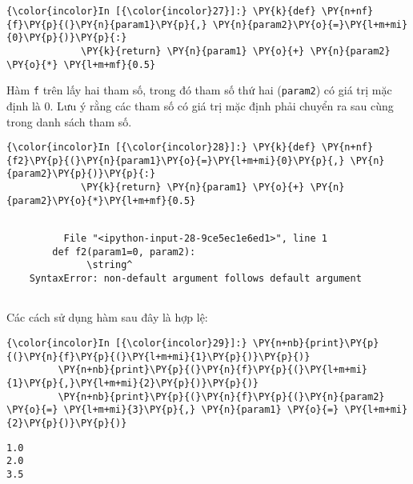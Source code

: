     
\begin{Verbatim}[commandchars=\\\{\}]
{\color{incolor}In [{\color{incolor}27}]:} \PY{k}{def} \PY{n+nf}{f}\PY{p}{(}\PY{n}{param1}\PY{p}{,} \PY{n}{param2}\PY{o}{=}\PY{l+m+mi}{0}\PY{p}{)}\PY{p}{:}
             \PY{k}{return} \PY{n}{param1} \PY{o}{+} \PY{n}{param2} \PY{o}{*} \PY{l+m+mf}{0.5}
\end{Verbatim}
    

    Hàm \texttt{f} trên lấy hai tham số, trong đó tham số thứ hai
(\texttt{param2}) có giá trị mặc định là 0. Lưu ý rằng các tham số có
giá trị mặc định phải chuyển ra sau cùng trong danh sách tham số.

    
\begin{Verbatim}[commandchars=\\\{\}]
{\color{incolor}In [{\color{incolor}28}]:} \PY{k}{def} \PY{n+nf}{f2}\PY{p}{(}\PY{n}{param1}\PY{o}{=}\PY{l+m+mi}{0}\PY{p}{,} \PY{n}{param2}\PY{p}{)}\PY{p}{:}
             \PY{k}{return} \PY{n}{param1} \PY{o}{+} \PY{n}{param2}\PY{o}{*}\PY{l+m+mf}{0.5}
\end{Verbatim}
    


    \begin{Verbatim}[commandchars=\\\{\}]

          File "<ipython-input-28-9ce5ec1e6ed1>", line 1
        def f2(param1=0, param2):
              \string^
    SyntaxError: non-default argument follows default argument


    \end{Verbatim}


    Các cách sử dụng hàm sau đây là hợp lệ:

    
\begin{Verbatim}[commandchars=\\\{\}]
{\color{incolor}In [{\color{incolor}29}]:} \PY{n+nb}{print}\PY{p}{(}\PY{n}{f}\PY{p}{(}\PY{l+m+mi}{1}\PY{p}{)}\PY{p}{)}
         \PY{n+nb}{print}\PY{p}{(}\PY{n}{f}\PY{p}{(}\PY{l+m+mi}{1}\PY{p}{,}\PY{l+m+mi}{2}\PY{p}{)}\PY{p}{)}
         \PY{n+nb}{print}\PY{p}{(}\PY{n}{f}\PY{p}{(}\PY{n}{param2} \PY{o}{=} \PY{l+m+mi}{3}\PY{p}{,} \PY{n}{param1} \PY{o}{=} \PY{l+m+mi}{2}\PY{p}{)}\PY{p}{)}
\end{Verbatim}
    

    \begin{Verbatim}[commandchars=\\\{\}]
1.0
2.0
3.5

    \end{Verbatim}

